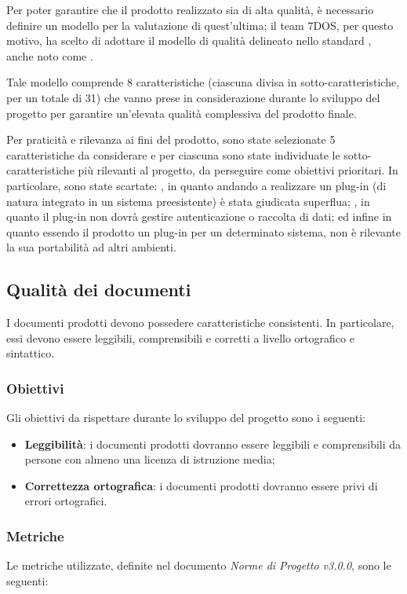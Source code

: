 Per poter garantire che il prodotto realizzato sia di alta qualità, è necessario definire un modello per la valutazione di quest'ultima; il team 7DOS, per questo motivo, ha scelto di adottare il modello di qualità delineato nello standard , anche noto come .

Tale modello comprende 8 caratteristiche (ciascuna divisa in sotto-caratteristiche, per un totale di 31) che vanno prese in considerazione durante lo sviluppo del progetto per garantire un'elevata qualità complessiva del prodotto finale.

Per praticità e rilevanza ai fini del prodotto, sono state selezionate 5 caratteristiche da considerare e per ciascuna sono state individuate le sotto-caratteristiche più rilevanti al progetto, da perseguire come obiettivi prioritari. In particolare, sono state scartate: , in quanto andando a realizzare un plug-in (di natura integrato in un sistema preesistente) è stata giudicata superflua; , in quanto il plug-in non dovrà gestire autenticazione o raccolta di dati; ed infine  in quanto essendo il prodotto un plug-in per un determinato sistema, non è rilevante la sua portabilità ad altri ambienti.

\subsection{Qualità dei documenti}
I documenti prodotti devono possedere caratteristiche consistenti. In particolare, essi devono essere leggibili, comprensibili e corretti a livello ortografico e sintattico.
\subsubsection{Obiettivi}
Gli obiettivi da rispettare durante lo sviluppo del progetto sono i seguenti:
	\begin{itemize}
		\item{\textbf{Leggibilità}: i documenti prodotti dovranno essere leggibili e comprensibili da persone con almeno una licenza di istruzione media;}
		\item{\textbf{Correttezza ortografica}: i documenti prodotti dovranno essere privi di errori ortografici.}
	\end{itemize}

\subsubsection{Metriche} 
Le metriche utilizzate, definite nel documento \emph{Norme di Progetto v3.0.0}, sono le seguenti:

